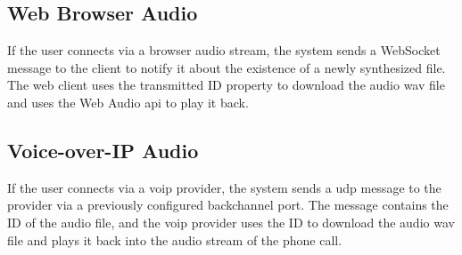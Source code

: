 \subsection{Web Browser Audio}

If the user connects via a browser audio stream, the system sends a WebSocket message to the client to notify it about 
the existence of a newly synthesized file. The web client uses the transmitted ID property to download the audio 
\ac{wav} file and uses the Web Audio \ac{api} to play it back.

\subsection{Voice-over-IP Audio}

If the user connects via a \ac{voip} provider, the system sends a \ac{udp} message to the provider via a previously 
configured backchannel port. The message contains the ID of the audio file, and the \ac{voip} provider uses the ID to 
download the audio \ac{wav} file and plays it back into the audio stream of the phone call.
